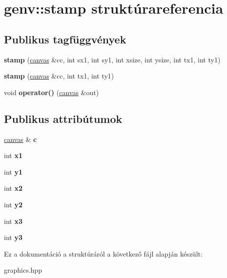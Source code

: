 \hypertarget{structgenv_1_1stamp}{}\section{genv\+:\+:stamp struktúrareferencia}
\label{structgenv_1_1stamp}
\subsection*{Publikus tagfüggvények}
\begin{DoxyCompactItemize}
\item 
\mbox{\label{structgenv_1_1stamp_a04b980659dede73ee427b386bc1e1d6f}} 
{\bfseries stamp} (\hyperlink{classgenv_1_1canvas}{canvas} \&cc, int sx1, int sy1, int xsize, int ysize, int tx1, int ty1)
\item 
\mbox{\label{structgenv_1_1stamp_a0f5534869474ebfcc76f0a1b76c002e1}} 
{\bfseries stamp} (\hyperlink{classgenv_1_1canvas}{canvas} \&cc, int tx1, int ty1)
\item 
\mbox{\label{structgenv_1_1stamp_adbf3f164077acc364b8d969790abc355}} 
void {\bfseries operator()} (\hyperlink{classgenv_1_1canvas}{canvas} \&out)
\end{DoxyCompactItemize}
\subsection*{Publikus attribútumok}
\begin{DoxyCompactItemize}
\item 
\mbox{\label{structgenv_1_1stamp_a992a28625961fa41bdf785baad6db5e4}} 
\hyperlink{classgenv_1_1canvas}{canvas} \& {\bfseries c}
\item 
\mbox{\label{structgenv_1_1stamp_a124ad3637e95b749d4bddbd5f072085e}} 
int {\bfseries x1}
\item 
\mbox{\label{structgenv_1_1stamp_aa2ba5da282ca8870adabcbe38b7fd86a}} 
int {\bfseries y1}
\item 
\mbox{\label{structgenv_1_1stamp_a50a845da12393ca2015371e5373560e8}} 
int {\bfseries x2}
\item 
\mbox{\label{structgenv_1_1stamp_afc836254c96ff493572d68beb88cbd2e}} 
int {\bfseries y2}
\item 
\mbox{\label{structgenv_1_1stamp_a363beae202447cbfb001c5d8cc3e3d44}} 
int {\bfseries x3}
\item 
\mbox{\label{structgenv_1_1stamp_a413c90fb7b97f2c7e6667094005da2f9}} 
int {\bfseries y3}
\end{DoxyCompactItemize}


Ez a dokumentáció a struktúráról a következő fájl alapján készült\+:\begin{DoxyCompactItemize}
\item 
graphics.\+hpp\end{DoxyCompactItemize}
